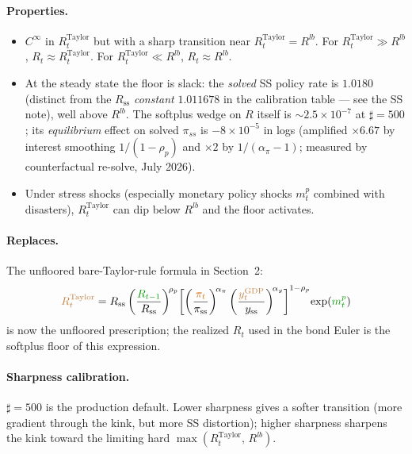 \documentclass[11pt]{article}
\begin{document}
\paragraph{Properties.}
\begin{itemize}
\item $C^{\infty}$ in $R^{\text{Taylor}}_t$ but with a sharp transition
  near $R^{\text{Taylor}}_t = R^{lb}$. For $R^{\text{Taylor}}_t \gg R^{lb}$,
  $R_t \approx R^{\text{Taylor}}_t$. For $R^{\text{Taylor}}_t \ll R^{lb}$,
  $R_t \approx R^{lb}$.
\item At the steady state the floor is slack: the \emph{solved} SS policy
  rate is $1.0180$ (distinct from the $R_{\text{ss}}$ \emph{constant}
  $1.011678$ in the calibration table --- see the SS note), well above
  $R^{lb}$. The softplus wedge on $R$ itself is
  ${\sim}2.5\times 10^{-7}$ at $\sharp = 500$; its \emph{equilibrium}
  effect on solved $\pi_{ss}$ is $-8\times 10^{-5}$ in logs (amplified
  ${\times}6.67$ by interest smoothing $1/(1-\rho_p)$ and ${\times}2$ by
  $1/(\alpha_\pi - 1)$; measured by counterfactual re-solve, July 2026).
\item Under stress shocks (especially monetary policy shocks $m_t^p$
  combined with disasters), $R^{\text{Taylor}}_t$ can dip below $R^{lb}$
  and the floor activates.
\end{itemize}

\paragraph{Replaces.}
The unfloored bare-Taylor-rule formula in Section~2:
\begin{equation*}
  \textcolor{brown}{R^{\text{Taylor}}_t}
    = R_{\text{ss}} \left(\frac{\textcolor{green!60!black}{R_{t-1}}}{R_{\text{ss}}}\right)^{\!\rho_p}
      \!\left[
        \left(\frac{\textcolor{orange!80!black}{\pi_t}}{\pi_{\text{ss}}}\right)^{\!\alpha_\pi}
        \left(\frac{\textcolor{brown}{y_t^{\text{GDP}}}}{y_{\text{ss}}}\right)^{\!\alpha_y}
      \right]^{1-\rho_p}
      \!\exp(\textcolor{green!60!black}{m_t^p})
\end{equation*}
is now the unfloored prescription; the realized $R_t$ used in the bond
Euler is the softplus floor of this expression.

\paragraph{Sharpness calibration.}
$\sharp = 500$ is the production default. Lower sharpness gives a
softer transition (more gradient through the kink, but more SS
distortion); higher sharpness sharpens the kink toward the limiting
hard $\max(R^{\text{Taylor}}_t,\, R^{lb})$.
\end{document}
